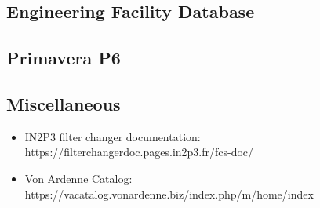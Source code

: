 \subsection{Engineering Facility Database}

\subsection{Primavera P6}

\subsection{Miscellaneous}
\begin{itemize}
	\item IN2P3 filter changer documentation: https://filterchangerdoc.pages.in2p3.fr/fcs-doc/
	\item Von Ardenne Catalog: https://vacatalog.vonardenne.biz/index.php/m/home/index
\end{itemize}
